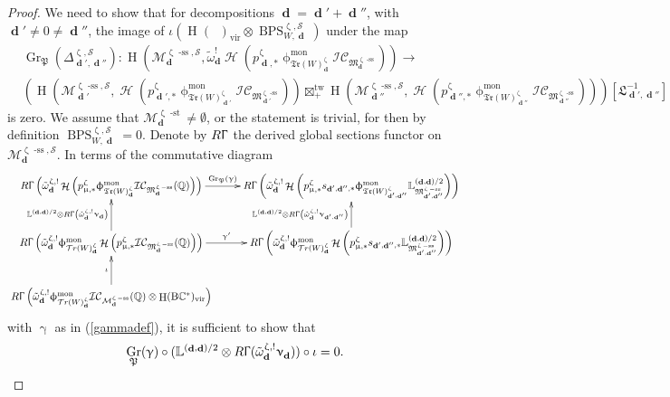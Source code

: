 \documentclass[a4paper,10pt]{amsart}
\renewcommand{\gamma}{\upgamma}
\renewcommand{\zeta}{\upzeta}
\renewcommand{\Gamma}{\Upgamma}
\renewcommand{\phi}{\upphi}
\renewcommand{\nu}{\upnu}
\renewcommand{\mu}{\upmu}
\DeclareMathOperator{\BC}{B\mathbb{C}^*}
\DeclareMathOperator{\Pf}{\mathfrak{P}}
\newcommand{\LL}{\mathbb{L}}
\newcommand{\QQ}{\mathbb{Q}}
\newcommand{\SP}{\mathcal{S}}
\newcommand{\WW}{\mathcal{T}r(W)}
\newcommand{\WWW}{\mathfrak{Tr}(W)}
\newcommand{\Mst}{\mathfrak{M}}
\newcommand{\Msp}{\mathcal{M}}
\newcommand{\ICS}{\mathcal{IC}}
\newcommand{\phim}[1]{\phi^{\mon}_{#1}}
\DeclareMathOperator{\sst}{-ss}
\DeclareMathOperator{\st}{-st}
\DeclareMathOperator{\tw}{tw}
\DeclareMathOperator{\mon}{mon}
\DeclareMathOperator{\Gr}{Gr}
\DeclareMathOperator{\dd}{\mathbf{d}}
\DeclareMathOperator{\DT}{BPS}
\DeclareMathOperator{\vir}{vir}
\DeclareMathOperator{\Ho}{\mathcal{H}}
\DeclareMathOperator{\HO}{H}
\begin{document}
\begin{proof}
We need to show that for decompositions $\dd=\dd'+\dd''$, with $\dd'\neq 0\neq \dd''$, the image of $\iota(\HO(\BC )_{\vir}\otimes\DT_{W,\dd}^{\zeta,\SP})$ under the map
\begin{align}
\label{int4}
&\Gr_{\Pf}(\Delta^{\zeta,\SP}_{\dd',\dd''})\colon \HO\left(\Msp_{\dd}^{\zeta\sst,\SP},\tilde{\omega}_{\dd}^!\Ho\left(p^{\zeta}_{\dd,*}\phim{\WWW^{\zeta}_{\dd}}\ICS_{\Mst_{\dd}^{\zeta\sst}}\right)\right)\rightarrow \\ \nonumber&\left(\HO\left(\Msp_{\dd'}^{\zeta\sst,\SP},\Ho\left(p^{\zeta}_{\dd',*}\phim{\WWW^{\zeta}_{\dd'}}\ICS_{\Mst_{\dd'}^{\zeta\sst}}\right)\right)\boxtimes_{+}^{\tw} \HO\left(\Msp^{\zeta\sst,\SP}_{\dd''},\Ho\left(p^{\zeta}_{\dd'',*}\phim{\WWW^{\zeta}_{\dd''}}\ICS_{\Mst_{\dd''}^{\zeta\sst}}\right)\right)\right)[\mathfrak{L}_{\dd',\dd''}^{-1}]
\end{align}
is zero.  We assume that $\Msp^{\zeta\st}_{\dd}\neq \emptyset$, or the statement is trivial, for then by definition $\DT_{W,\dd}^{\zeta,\SP}=0$.  Denote by $R\Gamma$ the derived global sections functor on $\Msp_{\dd}^{\zeta\sst,\SP}$.  In terms of the commutative diagram
\begin{equation}
\label{int5}
\xymatrix{
R\Gamma\left(\tilde{\omega}^{\zeta,!}_{\dd}\Ho\left(p^{\zeta}_{\mu,*}\phim{\WWW_{\dd}^{\zeta}}\ICS_{\Mst_{\dd}^{\zeta\sst}}(\QQ)\right)\right)\ar[r]^-{\Gr_{\Pf}(\gamma)} &R\Gamma\left(\tilde{\omega}^{\zeta,!}_{\dd}\Ho\left(p^{\zeta}_{\mu,*}s_{\dd',\dd'',*}\phim{\WWW^{\zeta}_{\dd',\dd''}}\LL^{(\dd,\dd)/2}_{\Mst^{\zeta\sst}_{\dd',\dd''}}\right)\right)\\
R\Gamma\left(\tilde{\omega}^{\zeta,!}_{\dd}\phim{\WW_{\dd}^{\zeta}}\Ho\left(p^{\zeta}_{\mu,*}\ICS_{\Mst_{\dd}^{\zeta\sst}}(\QQ)\right)\right)\ar[r]^-{\gamma'} \ar[u]^{\LL^{(\dd,\dd)/2}\otimes R\Gamma\left( \tilde{\omega}^{\zeta,!}_{\dd}\nu_{\dd}\right)}& R\Gamma\left(\tilde{\omega}^{\zeta,!}_{\dd}\phim{\WW_{\dd}^{\zeta}}\Ho\left(p^{\zeta}_{\mu,*}s_{\dd',\dd'',*}\LL^{(\dd,\dd)/2}_{\Mst^{\zeta\sst}_{\dd',\dd''}}\right)\right)\ar[u]^{\LL^{(\dd,\dd)/2}\otimes R\Gamma\left(\tilde{\omega}^{\zeta,!}_{\dd}\nu_{\dd',\dd''}\right)}\\
R\Gamma\left( \tilde{\omega}^{\zeta,!}_{\dd}\phim{\WW^{\zeta}_{\dd}}\ICS_{\Msp^{\zeta\sst}_{\dd}}(\QQ)\otimes\HO(\BC )_{\vir}\right)\ar[u]^{\iota}
}
\end{equation}
with $\gamma$ as in (\ref{gammadef}), it is sufficient to show that 
\[
\Gr_{\Pf}(\gamma)\circ(\LL^{(\dd,\dd)/2}\otimes R\Gamma(\tilde{\omega}^{\zeta,!}_{\dd}\nu_{\dd}))\circ\iota=0.
\]
\end{proof}
\end{document}
